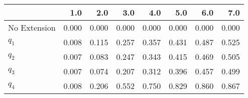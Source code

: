 \begin{tabular}{lrrrrrrr}
\toprule
{} &   1.0 &   2.0 &   3.0 &   4.0 &   5.0 &   6.0 &   7.0 \\
\midrule
No Extension & 0.000 & 0.000 & 0.000 & 0.000 & 0.000 & 0.000 & 0.000 \\
$q_1$        & 0.008 & 0.115 & 0.257 & 0.357 & 0.431 & 0.487 & 0.525 \\
$q_2$        & 0.007 & 0.083 & 0.247 & 0.343 & 0.415 & 0.469 & 0.505 \\
$q_3$        & 0.007 & 0.074 & 0.207 & 0.312 & 0.396 & 0.457 & 0.499 \\
$q_4$        & 0.008 & 0.206 & 0.552 & 0.750 & 0.829 & 0.860 & 0.867 \\
\bottomrule
\end{tabular}

